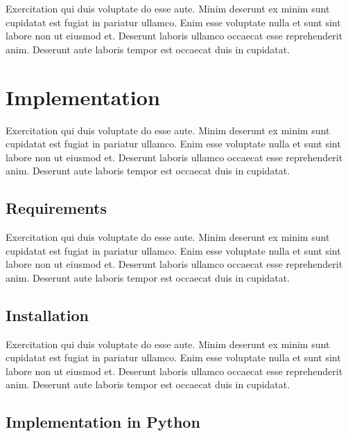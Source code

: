 Exercitation qui duis voluptate do esse aute. Minim deserunt ex minim sunt cupidatat est fugiat in pariatur ullamco. Enim esse voluptate nulla et sunt sint labore non ut eiusmod et. Deserunt laboris ullamco occaecat esse reprehenderit anim. Deserunt aute laboris tempor est occaecat duis in cupidatat.


\section{Implementation} \label{sec:implementationNeo4j}

Exercitation qui duis voluptate do esse aute. Minim deserunt ex minim sunt cupidatat est fugiat in pariatur ullamco. Enim esse voluptate nulla et sunt sint labore non ut eiusmod et. Deserunt laboris ullamco occaecat esse reprehenderit anim. Deserunt aute laboris tempor est occaecat duis in cupidatat.

\subsection{Requirements} \label{subsec:requirementsNeo4j}

Exercitation qui duis voluptate do esse aute. Minim deserunt ex minim sunt cupidatat est fugiat in pariatur ullamco. Enim esse voluptate nulla et sunt sint labore non ut eiusmod et. Deserunt laboris ullamco occaecat esse reprehenderit anim. Deserunt aute laboris tempor est occaecat duis in cupidatat.

\subsection{Installation} \label{subsec:installationNeo4j}

Exercitation qui duis voluptate do esse aute. Minim deserunt ex minim sunt cupidatat est fugiat in pariatur ullamco. Enim esse voluptate nulla et sunt sint labore non ut eiusmod et. Deserunt laboris ullamco occaecat esse reprehenderit anim. Deserunt aute laboris tempor est occaecat duis in cupidatat.

\subsection{Implementation in Python} \label{subsec:implementationPythonNeo4j}

